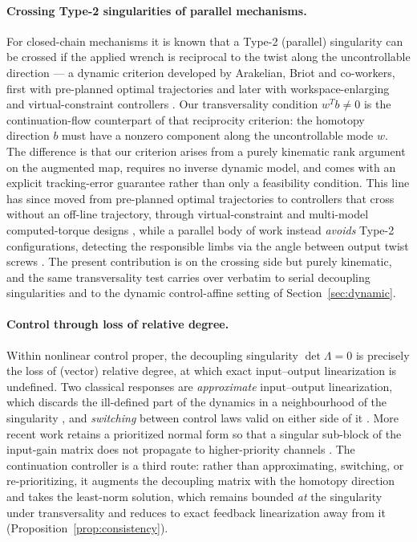 \documentclass[11pt,american]{article}
\theoremstyle{definition}
\theoremstyle{plain}
\theoremstyle{remark}
\begin{document}
\paragraph{Crossing Type-2 singularities of parallel mechanisms.} For closed-chain mechanisms it is known that a Type-2 (parallel) singularity can be crossed if the applied wrench is reciprocal to the twist along the uncontrollable direction --- a dynamic criterion developed by Arakelian, Briot and co-workers, first with pre-planned optimal trajectories and later with workspace-enlarging and virtual-constraint controllers \cite{Briot2008,Pagis2015,Briot2016}. Our transversality condition $w^Tb \ne 0$ is the continuation-flow counterpart of that reciprocity criterion: the homotopy direction $b$ must have a nonzero component along the uncontrollable mode $w$. The difference is that our criterion arises from a purely kinematic rank argument on the augmented map, requires no inverse dynamic model, and comes with an explicit tracking-error guarantee rather than only a feasibility condition. This line has since moved from pre-planned optimal trajectories to controllers that cross without an off-line trajectory, through virtual-constraint and multi-model computed-torque designs \cite{Pagis2015,Pagis2017}, while a parallel body of work instead \emph{avoids} Type-2 configurations, detecting the responsible limbs via the angle between output twist screws \cite{OTSAvoid2024}. The present contribution is on the crossing side but purely kinematic, and the same transversality test carries over verbatim to serial decoupling singularities and to the dynamic control-affine setting of Section~\ref{sec:dynamic}.

\paragraph{Control through loss of relative degree.} Within nonlinear control proper, the decoupling singularity $\det\Lambda = 0$ is precisely the loss of (vector) relative degree, at which exact input--output linearization is undefined. Two classical responses are \emph{approximate} input--output linearization, which discards the ill-defined part of the dynamics in a neighbourhood of the singularity \cite{HauserSastry1992}, and \emph{switching} between control laws valid on either side of it \cite{TomlinSastry1998}. More recent work retains a prioritized normal form so that a singular sub-block of the input-gain matrix does not propagate to higher-priority channels \cite{PriorityFBL2023}. The continuation controller is a third route: rather than approximating, switching, or re-prioritizing, it augments the decoupling matrix with the homotopy direction and takes the least-norm solution, which remains bounded \emph{at} the singularity under transversality and reduces to exact feedback linearization away from it (Proposition~\ref{prop:consistency}).
\end{document}
